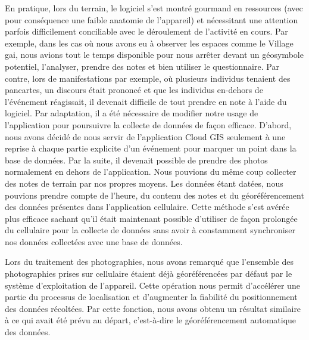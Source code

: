En pratique, lors du terrain, le logiciel s'est montré gourmand en ressources (avec pour conséquence une faible anatomie de l'appareil) et nécessitant une attention parfois difficilement conciliable avec le déroulement de l'activité en cours.
Par exemple, dans les cas où nous avons eu à observer les espaces comme le Village gai, nous avions tout le temps disponible pour nous arrêter devant un géosymbole potentiel, l'analyser, prendre des notes et bien utiliser le questionnaire.
Par contre, lors de manifestations par exemple, où plusieurs individus tenaient des pancartes, un discours était prononcé et que les individus en-dehors de l'événement réagissait, il devenait difficile de tout prendre en note à l'aide du logiciel.
Par adaptation, il a été nécessaire de modifier notre usage de l'application pour poursuivre la collecte de données de façon efficace.
D'abord, nous avons décidé de nous servir de l'application Cloud GIS seulement à une reprise à chaque partie explicite d'un événement pour marquer un point dans la base de données.
Par la suite, il devenait possible de prendre des photos normalement en dehors de l'application.
Nous pouvions du même coup collecter des notes de terrain par nos propres moyens.
Les données étant datées, nous pouvions prendre compte de l'heure, du contenu des notes et du géoréférencement des données présentes dans l'application cellulaire.
Cette méthode s'est avérée plus efficace sachant qu'il était maintenant possible d'utiliser de façon prolongée du cellulaire pour la collecte de données sans avoir à constamment synchroniser nos données collectées avec une base de données.

Lors du traitement des photographies, nous avons remarqué que l'ensemble des photographies prises sur cellulaire étaient déjà géoréférencées par défaut par le système d'exploitation de l'appareil.
Cette opération nous permit d'accélérer une partie du processus de localisation et d'augmenter la fiabilité du positionnement des données récoltées.
Par cette fonction, nous avons obtenu un résultat similaire à ce qui avait été prévu au départ, c'est-à-dire le géoréférencement automatique des données.

